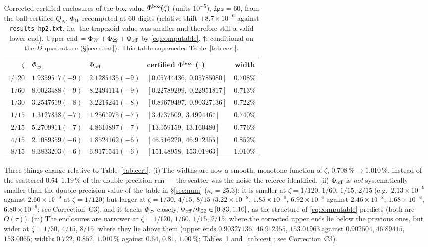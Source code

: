 \documentclass[11pt]{article}
\begin{document}
\begin{table}[ht]\centering\small
\caption{Corrected certified enclosures of the box value $\Phi^{\rm box}(\zeta)$ (units $10^{-5}$),
$\mathtt{dps}=60$, from the ball-certified $Q_N$.  $\Phi_W$ recomputed at $60$ digits (relative shift
$+8.7\times10^{-6}$ against \texttt{results\_hp2.txt}, i.e.\ the trapezoid value was smaller and
therefore still a valid lower end).  Upper end $=\Phi_W+\Phi_{22}+\Phi_{\rm off}$ by
\eqref{eq:computable}.  $\dagger$: conditional on the $\widehat D$ quadrature (\S\ref{sec:dhat}).
This table supersedes Table~\ref{tab:cert}.}\label{tab:rcr}
\begin{tabular}{r l l l c}\toprule
$\zeta$ & $\Phi_{22}$ & $\Phi_{\rm off}$ & certified $\Phi^{\rm box}$ ($\dagger$) & width\\\midrule
$1/120$ & $1.9359517(-9)$ & $2.1285135(-9)$ & $[0.05744436,\ 0.05785080]$ & $0.708\%$\\
$1/60$  & $8.0023488(-9)$ & $8.2494114(-9)$ & $[0.22789299,\ 0.22951817]$ & $0.713\%$\\
$1/30$  & $3.2547619(-8)$ & $3.2216241(-8)$ & $[0.89679497,\ 0.90327136]$ & $0.722\%$\\
$1/15$  & $1.3127838(-7)$ & $1.2567975(-7)$ & $[3.4737509,\ 3.4994467]$   & $0.740\%$\\
$2/15$  & $5.2709911(-7)$ & $4.8610897(-7)$ & $[13.059159,\ 13.160480]$   & $0.776\%$\\
$4/15$  & $2.1089359(-6)$ & $1.8524162(-6)$ & $[46.516220,\ 46.912355]$   & $0.852\%$\\
$8/15$  & $8.3833203(-6)$ & $6.9171541(-6)$ & $[151.48958,\ 153.01963]$   & $1.010\%$\\
\bottomrule\end{tabular}\end{table}

Three things change relative to Table~\ref{tab:cert}.  (i) The widths are now a smooth, monotone
function of $\zeta$, $0.708\,\%\to1.010\,\%$, instead of the scattered $0.64$--$1.19\,\%$ of the
double-precision run --- the scatter was the noise the referee identified.  (ii) $\Phi_{\rm off}$ is
\emph{not} systematically smaller than the double-precision value of the table in \S\ref{sec:num} ($\kappa_c=25.3$): it is smaller at $\zeta=1/120$, $1/60$, $1/15$, $2/15$ (e.g.\ $2.13\times10^{-9}$ against
$2.60\times10^{-9}$ at $\zeta=1/120$) but larger at $\zeta=1/30$, $4/15$, $8/15$ ($3.22\times10^{-8}$, $1.85\times10^{-6}$, $6.92\times10^{-6}$ against $2.46\times10^{-8}$, $1.68\times10^{-6}$, $6.80\times10^{-6}$; see Correction~C3), and it tracks $\Phi_{22}$ closely, $\Phi_{\rm off}/\Phi_{22}\in
[0.83,1.10]$, as the structure of \eqref{eq:computable} predicts (both are $O(\tau)$).  (iii) The
enclosures are narrower at $\zeta=1/120$, $1/60$, $1/15$, $2/15$, where the corrected upper ends lie below the previous ones, but wider at $\zeta=1/30$, $4/15$, $8/15$, where they lie above them (upper ends $0.90327136$, $46.912355$, $153.01963$ against $0.902504$, $46.89415$, $153.0065$; widths $0.722$, $0.852$, $1.010\,\%$ against $0.64$, $0.81$, $1.00\,\%$; Tables~\ref{tab:rcr} and~\ref{tab:cert}; see Correction~C3).
\end{document}
